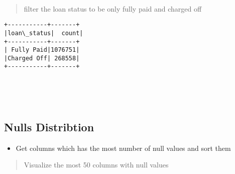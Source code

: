 \documentclass[11pt]{article}
\providecommand{\tightlist}{%
      \setlength{\itemsep}{0pt}\setlength{\parskip}{0pt}}
\begin{document}
    \begin{center}
    \end{center}
    { \hspace*{\fill} \\}
    
    \begin{quote}
filter the loan status to be only fully paid and charged off
\end{quote}

    \begin{Verbatim}[commandchars=\\\{\}]
+-----------+-------+
|loan\_status|  count|
+-----------+-------+
| Fully Paid|1076751|
|Charged Off| 268558|
+-----------+-------+

    \end{Verbatim}

    \begin{center}
    \end{center}
    { \hspace*{\fill} \\}
    
    \begin{center}
    \end{center}
    { \hspace*{\fill} \\}
    
    \hypertarget{nulls-distribtion}{%
\subsection{Nulls Distribtion}\label{nulls-distribtion}}

\begin{itemize}
\tightlist
\item
  Get columns which has the most number of null values and sort them
\end{itemize}

    \begin{quote}
Visualize the most 50 columns with null values
\end{quote}

    \begin{center}
    \end{center}
    { \hspace*{\fill} \\}
    
\end{document}
